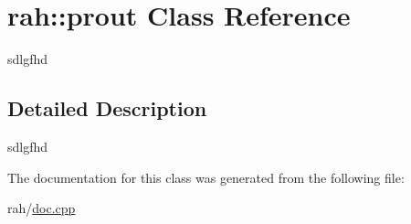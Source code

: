 \hypertarget{classrah_1_1prout}{}\section{rah\+::prout Class Reference}
\label{classrah_1_1prout}


sdlgfhd  




\subsection{Detailed Description}
sdlgfhd 

The documentation for this class was generated from the following file\+:\begin{DoxyCompactItemize}
\item 
rah/\mbox{\hyperlink{doc_8cpp}{doc.\+cpp}}\end{DoxyCompactItemize}
